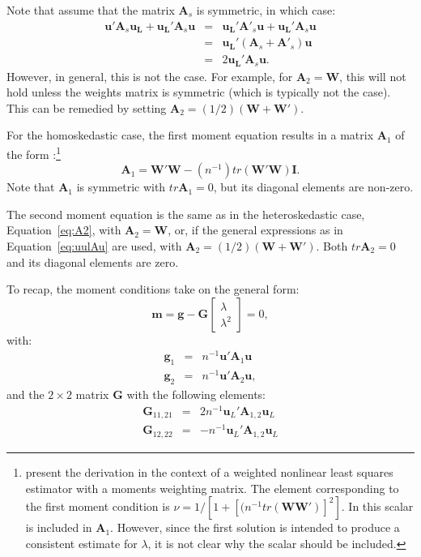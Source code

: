 \documentclass{article}
\begin{document}
Note that \citet[p. 7]{Drukkeretal:10} assume that the matrix $\mathbf{A}_s$ is symmetric,
in which case:
\begin{eqnarray}
\mathbf{u'} \mathbf{A}_s \mathbf{u_L} 
 +  \mathbf{u_L'} \mathbf{A}_s \mathbf{u} &=& \mathbf{u_L'} \mathbf{A'}_s \mathbf{u} 
 +  \mathbf{u_L'} \mathbf{A}_s \mathbf{u}\\
 &=& \mathbf{u_L'} ( \mathbf{A}_s + \mathbf{A'}_s )  \mathbf{u}\\
 &=& 2  \mathbf{u_L'}  \mathbf{A}_s  \mathbf{u}. \label{eq:uulAu}
\end{eqnarray}
However, in general, this is not the case. For example, for $\mathbf{A}_2 = \mathbf{W}$,
this will not hold unless the weights matrix is symmetric (which is typically not the case).
This can be remedied by setting $\mathbf{A}_2 = (1/2)( \mathbf{W} + \mathbf{W'} )$.

For the homoskedastic case, the first moment equation results in a matrix $\mathbf{A}_1$
of the form \citep[see, e.g.,][footnote 7]{KelejianPrucha:10}:\footnote{\citet[Equation 9]{KelejianPrucha:10} present the derivation in the context of a weighted nonlinear
least squares estimator with a moments weighting matrix. The element corresponding
to the first moment condition is $\nu = 1 / [1 + [(n^{-1} tr (\mathbf{WW'})]^2]$. In
\cite{Drukkeretal:10,Drukkeretal:11} this scalar is included in $\mathbf{A}_1$. However, since the
first solution is intended to produce a consistent estimate for $\lambda$, it is not
clear why the scalar should be included.}
\begin{equation*}
\mathbf{A}_1 = \mathbf{W'W} - (n^{-1}) tr (\mathbf{W'W}) \mathbf{I}.
\end{equation*} 
Note that $\mathbf{A}_1$ is symmetric with $tr \mathbf{A}_1 = 0$, but its diagonal
elements are non-zero.
 
The second moment equation is the same as in the heteroskedastic case, Equation~\ref{eq:A2},
with $\mathbf{A}_2 = \mathbf{W}$, or, if the general expressions as in Equation~\ref{eq:uulAu}
are used, with $\mathbf{A}_2 = (1/2) (\mathbf{W} + \mathbf{W'})$. Both $tr \mathbf{A}_2 = 0$
and its diagonal elements are zero.

To recap, the moment conditions take on the general form:
\begin{equation*}
\mathbf{m} = \mathbf{g} - \mathbf{G}
\left[
\begin{matrix}
\lambda\\
\lambda^2
\end{matrix}
\right] = 0,
\end{equation*}
with:
\begin{eqnarray*}
 \mathbf{g}_1 &=& n^{-1} \mathbf{u}' \mathbf{A}_1 \mathbf{u} \\
  \mathbf{g}_2 &=& n^{-1} \mathbf{u}' \mathbf{A}_2 \mathbf{u},
\end{eqnarray*}
and
the $2 \times 2$ matrix $\mathbf{G}$ with the following elements:
\begin{eqnarray}
\mathbf{G}_{11,21} &=& 2n^{-1} \mathbf{u}_L' \mathbf{A}_{1, 2} \mathbf{u}_L \label{eq:newgcol1}\\
\mathbf{G}_{12,22} &=& - n^{-1} \mathbf{u}_L'  \mathbf{A}_{1, 2} \mathbf{u}_L \label{eq:newgcol2}
\end{eqnarray}
\end{document}
